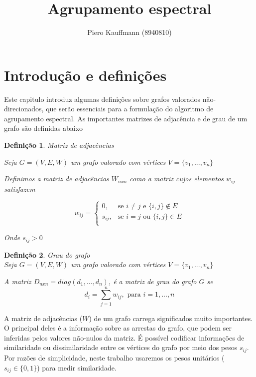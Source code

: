 \documentclass[]{article}
\title{Agrupamento espectral}
\author{Piero Kauffmann (8940810)}
\newtheorem{definition}{Definição}[section]
\begin{document}
\maketitle

\section{Introdução e definições}

Este capitulo introduz algumas definições sobre grafos valorados não-direcionados, que serão essenciais para a formulação do algoritmo de agrupamento espectral. As importantes matrizes de adjacência e de grau de um grafo são definidas abaixo


\begin{definition}{Matriz de adjacências}

\vspace{0.1cm}

Seja $G = (V, E, W)$ um grafo valorado com vértices $V = \{v_1, ..., v_n\}$

Definimos a matriz de adjacências $W_{nxn}$ como a matriz cujos elementos $w_{ij}$ satisfazem


\[
    w_{ij}= 
\begin{cases}
    0, & \text{se } i \neq j \text{ e } \{i,j\} \not\in E\\
    s_{ij}, & \text{se } i = j \text{ ou } \{i,j\} \in E\\

\end{cases}
\]

Onde $s_{ij} > 0 $

\end{definition}

\begin{definition}{Grau do grafo}\\
\vspace{0.1cm}
Seja $G = (V, E, W)$ um grafo valorado com vértices $V = \{v_1, ..., v_n\}$

\vspace{0.1cm}

A matriz $D_{nxn} = diag(d_1, ..., d_n)$, é a matriz de grau do grafo $G$ se 
$$d_i = \sum_{j = 1}^{n} w_{ij}, \text{ para } i = 1, ..., n$$

\end{definition}

\vspace{.3cm}

A matriz de adjacências ($W$) de um grafo carrega significados muito importantes. O principal deles é a informação sobre as arrestas do grafo, que podem ser inferidas pelos valores não-nulos da matriz. É possível codificar informações de similaridade ou dissimilaridade entre os vértices do grafo por meio dos pesos $s_{ij}$. Por razões de simplicidade, neste trabalho usaremos os pesos unitários ($s_{ij} \in \{0, 1\}$) para medir similaridade.
\end{document}
